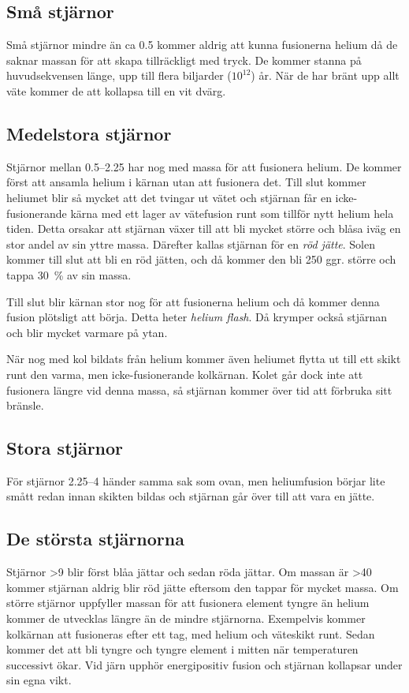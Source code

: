 \subsection{Små stjärnor}
Små stjärnor mindre än ca \qty{0.5}{\Mo} kommer aldrig att kunna fusionerna helium då de saknar massan för att skapa tillräckligt med tryck. De kommer stanna på huvudsekvensen länge, upp till flera biljarder ($10^{12}$) år. När de har bränt upp allt väte kommer de att kollapsa till en vit dvärg.

\subsection{Medelstora stjärnor}
Stjärnor mellan \qtyrange{0.5}{2.25}{\Mo} har nog med massa för att fusionera helium. De kommer först att ansamla helium i kärnan utan att fusionera det. Till slut kommer heliumet blir så mycket att det tvingar ut vätet och stjärnan får en icke-fusionerande kärna med ett lager av vätefusion runt som tillför nytt helium hela tiden. Detta orsakar att stjärnan växer till att bli mycket större och blåsa iväg en stor andel av sin yttre massa. Därefter kallas stjärnan för en \emph{röd jätte}. Solen kommer till slut att bli en röd jätten, och då kommer den bli \num{250} ggr. större och tappa \qty{30}{\percent} av sin massa.

Till slut blir kärnan stor nog för att fusionerna helium och då kommer denna fusion plötsligt att börja. Detta heter \emph{helium flash}. Då krymper också stjärnan och blir mycket varmare på ytan.

När nog med kol bildats från helium kommer även heliumet flytta ut till ett skikt runt den varma, men icke-fusionerande kolkärnan. Kolet går dock inte att fusionera längre vid denna massa, så stjärnan kommer över tid att förbruka sitt bränsle.

\subsection{Stora stjärnor}
För stjärnor \qtyrange{2.25}{4}{\Mo} händer samma sak som ovan, men heliumfusion börjar lite smått redan innan skikten bildas och stjärnan går över till att vara en jätte.

\subsection{De största stjärnorna}
Stjärnor \qty{>9}{\Mo} blir först blåa jättar och sedan röda jättar. Om massan är \qty{>40}{\Mo} kommer stjärnan aldrig blir röd jätte eftersom den tappar för mycket massa. Om större stjärnor uppfyller massan för att fusionera element tyngre än helium kommer de utvecklas längre än de mindre stjärnorna. Exempelvis kommer kolkärnan att fusioneras efter ett tag, med helium och väteskikt runt. Sedan kommer det att bli tyngre och tyngre element i mitten när temperaturen successivt ökar. Vid järn upphör energipositiv fusion och stjärnan kollapsar under sin egna vikt.

